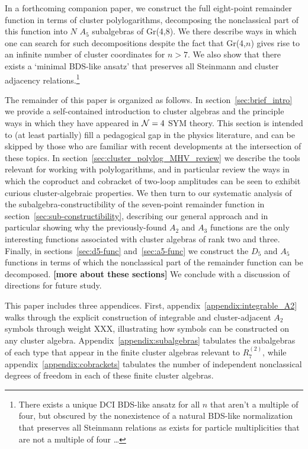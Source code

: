 \documentclass[11pt]{article}
\def\draftnote#1{{\bf [#1]}}
\begin{document}
In a forthcoming companion paper, we construct the full eight-point remainder function in terms of cluster polylogarithms, decomposing the nonclassical part of this function into $N$ $A_5$ subalgebras of Gr(4,8). We there describe ways in which one can search for such decompositions despite the fact that Gr(4,$n$) gives rise to an infinite number of cluster coordinates for $n>7$. We also show that there exists a `minimal BDS-like ansatz' that preserves all Steinmann and cluster adjacency relations.\footnote{There exists a unique DCI BDS-like ansatz for all $n$ that aren't a multiple of four, but  obscured by the nonexistence of a natural BDS-like normalization that preserves all Steinmann relations as exists for particle multiplicities that are not a multiple of four \dots}

The remainder of this paper is organized as follows. In section~\ref{sec:brief_intro} we provide a self-contained introduction to cluster algebras and the principle ways in which they have appeared in ${\cal N} =4$ SYM theory. This section is intended to (at least partially) fill a pedagogical gap in the physics literature, and can be skipped by those who are familiar with recent developments at the intersection of these topics. In section~\ref{sec:cluster_polylog_MHV_review} we describe the tools relevant for working with polylogarithms, and in particular review the ways in which the coproduct and cobracket of two-loop amplitudes can be seen to exhibit curious cluster-algebraic properties. We then turn to our systematic analysis of the subalgebra-constructibility of the seven-point remainder function in section~\ref{sec:sub-constructibility}, describing our general approach and in particular showing why the previously-found $A_2$ and $A_3$ functions are the only interesting functions associated with cluster algebras of rank two and three. Finally, in sections~\ref{sec:d5-func} and~\ref{sec:a5-func} we construct the $D_5$ and $A_5$ functions in terms of which the nonclassical part of the remainder function can be decomposed. \draftnote{more about these sections} We conclude with a discussion of directions for future study.

This paper includes three appendices. First, appendix~\ref{appendix:integrable_A2} walks through the explicit construction of integrable and cluster-adjacent $A_2$ symbols through weight XXX, illustrating how symbols can be constructed on any cluster algebra. Appendix~\ref{appendix:subalgebras} tabulates the subalgebras of each type that appear in the finite cluster algebras relevant to $R_7^{(2)}$, while appendix~\ref{appendix:cobrackets} tabulates the number of independent nonclassical degrees of freedom in each of these finite cluster algebras.
\end{document}
